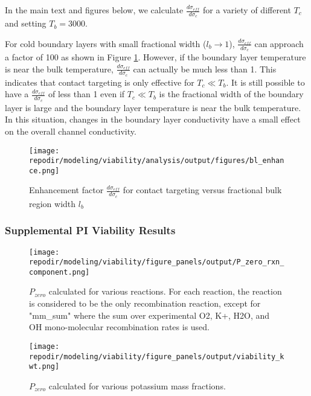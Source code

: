 
In the main text and figures below, we calculate $\frac{d\sigma_{eff}}{d\sigma_{c}}$ for a variety of different $T_{c}$ and setting $T_{b} = 3000$.

For cold boundary layers with small fractional width ($l_{b}\rightarrow1$), $\frac{d\sigma_{eff}}{d\sigma_{c}}$ can approach a factor of 100 as shown in Figure \ref{fig:SI_bl_enhance}. However, if the boundary layer temperature is near the bulk temperature, $\frac{d\sigma_{eff}}{d\sigma_{c}}$ can actually be much less than 1. This indicates that contact targeting is only effective for $T_{c} \ll T_{b}$. It is still possible to have a $\frac{d\sigma_{eff}}{d\sigma_{c}}$ of less than 1 even if $T_{c} \ll T_{b}$ is the fractional width of the boundary layer is large and the  boundary layer temperature is near the bulk temperature. In this situation, changes in the boundary layer conductivity have a small effect on the overall channel conductivity.

\begin{figure}[h]
    \centering
    \texttt{[image: \\repodir/modeling/viability/analysis/output/figures/bl\_enhance.png]} 
    \caption{Enhancement factor $\frac{d\sigma_{eff}}{d\sigma_{c}}$ for contact targeting versus fractional bulk region width $l_b$}
    \label{fig:SI_bl_enhance}
\end{figure}

\clearpage

\subsubsection{Supplemental PI Viability Results}

\begin{figure}[h]
    \centering
    \texttt{[image: \\repodir/modeling/viability/figure\_panels/output/P\_zero\_rxn\_component.png]} 
    \caption{$P_{zero}$ calculated for various reactions. For each reaction, the reaction is considered to be the only recombination reaction, except for "mm\_sum" where the sum over experimental O2, K+, H2O, and OH mono-molecular recombination rates is used.}
    \label{fig:SI_P_zero_rxn_component}
\end{figure}


\begin{figure}[h]
    \centering
    \texttt{[image: \\repodir/modeling/viability/figure\_panels/output/viability\_kwt.png]} 
    \caption{$P_{zero}$ calculated for various potassium mass fractions. }
    \label{fig:SI_P_zero_kwt}
\end{figure}

